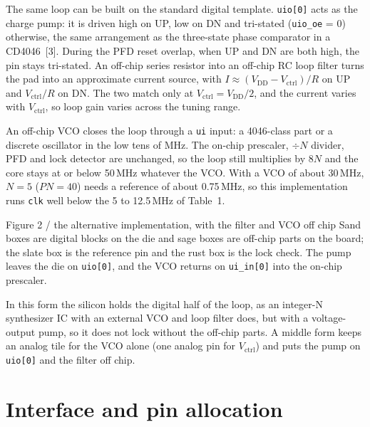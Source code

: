 \documentclass[11pt]{article}
\newcommand{\pin}[1]{\texttt{#1}}              %
\newcommand{\MHz}{\,MHz}
\newcommand{\vctrl}{V_\mathrm{ctrl}}
\begin{document}
The same loop can be built on the standard digital template. \pin{uio[0]} acts as the charge pump: it is driven high on UP, low on DN and tri-stated (\pin{uio\_oe} = 0) otherwise, the same arrangement as the three-state phase comparator in a CD4046~[3]. During the PFD reset overlap, when UP and DN are both high, the pin stays tri-stated. An off-chip series resistor into an off-chip RC loop filter turns the pad into an approximate current source, with $I \approx (V_\mathrm{DD} - \vctrl)/R$ on UP and $\vctrl/R$ on DN. The two match only at $\vctrl = V_\mathrm{DD}/2$, and the current varies with $\vctrl$, so loop gain varies across the tuning range.

An off-chip VCO closes the loop through a \pin{ui} input: a 4046-class part or a discrete oscillator in the low tens of MHz. The on-chip prescaler, $\div N$ divider, PFD and lock detector are unchanged, so the loop still multiplies by $8N$ and the core stays at or below 50\MHz{} whatever the VCO. With a VCO of about 30\MHz, $N = 5$ ($PN = 40$) needs a reference of about 0.75\MHz, so this implementation runs \pin{clk} well below the 5 to 12.5\MHz{} of Table~1.

\begin{hsfigure}{Figure 2 / the alternative implementation, with the filter and VCO off chip}%
{Sand boxes are digital blocks on the die and sage boxes are off-chip parts on the board; the slate box is the reference pin and the rust box is the lock check. The pump leaves the die on \pin{uio[0]}, and the VCO returns on \pin{ui\_in[0]} into the on-chip prescaler.}
\end{hsfigure}

In this form the silicon holds the digital half of the loop, as an integer-N synthesizer IC with an external VCO and loop filter does, but with a voltage-output pump, so it does not lock without the off-chip parts. A middle form keeps an analog tile for the VCO alone (one analog pin for $\vctrl$) and puts the pump on \pin{uio[0]} and the filter off chip.

\clearpage
\section{Interface and pin allocation}\label{sec:pins}
\end{document}
